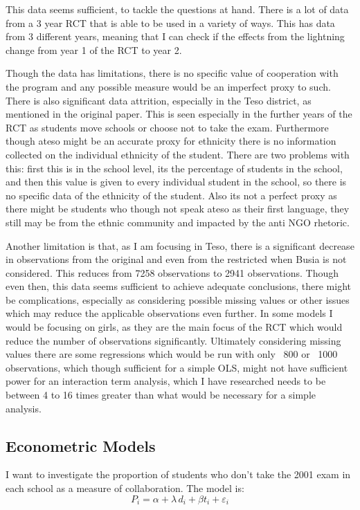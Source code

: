 \documentclass{article}
\begin{document}
This data seems sufficient, to tackle the questions at hand. There is a lot of data from a 3 year RCT that is able to be used in a variety of ways. This has data from 3 different years, meaning that I can check if the effects from the lightning change from year 1 of the RCT to year 2. 

Though the data has limitations, there is no specific value of cooperation with the program and any possible measure would be an imperfect proxy to such. There is also significant data attrition, especially in the Teso district, as mentioned in the original paper. This is seen especially in the further years of the RCT as students move schools or choose not to take the exam. Furthermore though ateso might be an accurate proxy for ethnicity there is no information collected on the individual ethnicity of the student. There are two problems with this: first this is in the school level, its the percentage of students in the school, and then this value is given to every individual student in the school, so there is no specific data of the ethnicity of the student. Also its not a perfect proxy as there might be students who though not speak ateso as their first language, they still may be from the ethnic community and impacted by the anti NGO rhetoric. 
	
Another limitation is that, as I am focusing in Teso, there is a significant decrease in observations from the original and even from the restricted when Busia is not considered. This reduces from 7258 observations to 2941 observations. Though even then, this data seems sufficient to achieve adequate conclusions, there might be complications, especially as considering possible missing values or other issues which may reduce the applicable observations even further. In some models I would be focusing on girls, as they are the main focus of the RCT which would reduce the number of observations significantly. Ultimately considering missing values there are some regressions which would be run with only ~800 or ~1000 observations, which though sufficient for a simple OLS, might not have sufficient power for an interaction term analysis, which I have researched needs to be between 4 to 16 times greater than what would be necessary for a simple analysis. \autocites{gelman-2018-need16}

\subsection{Econometric Models}
I want to investigate the proportion of students who don't take the 2001 exam in each school as a measure of collaboration. The model is: \[
P_i = \alpha + \lambda\, d_i + \beta t_i + \varepsilon_i
\]
\end{document}
